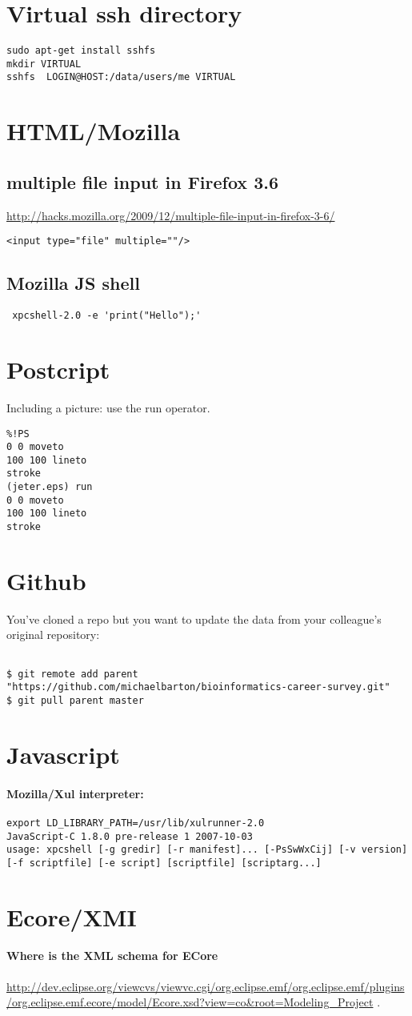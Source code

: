 \documentclass[12pt]{article}
\begin{document}
\section{Virtual ssh directory}
\begin{verbatim}
sudo apt-get install sshfs
mkdir VIRTUAL
sshfs  LOGIN@HOST:/data/users/me VIRTUAL
\end{verbatim}

\section{HTML/Mozilla}
\subsection{multiple file input in Firefox 3.6}
\url{http://hacks.mozilla.org/2009/12/multiple-file-input-in-firefox-3-6/}
\begin{verbatim}
<input type="file" multiple=""/>
\end{verbatim}
\subsection{Mozilla JS shell}
\begin{verbatim}
 xpcshell-2.0 -e 'print("Hello");'
\end{verbatim}
\section{Postcript}
Including a picture: use the run operator.
\begin{verbatim}
%!PS
0 0 moveto
100 100 lineto
stroke
(jeter.eps) run
0 0 moveto
100 100 lineto
stroke
\end{verbatim}
\section{Github}
You've cloned a repo but you want to update the data from your colleague's original repository:
\begin{verbatim}

$ git remote add parent "https://github.com/michaelbarton/bioinformatics-career-survey.git"
$ git pull parent master
\end{verbatim}
\section{Javascript}
\paragraph{Mozilla/Xul interpreter:}
\begin{verbatim}
export LD_LIBRARY_PATH=/usr/lib/xulrunner-2.0
JavaScript-C 1.8.0 pre-release 1 2007-10-03
usage: xpcshell [-g gredir] [-r manifest]... [-PsSwWxCij] [-v version] [-f scriptfile] [-e script] [scriptfile] [scriptarg...]
\end{verbatim}
\section{Ecore/XMI}
\paragraph{Where is the XML schema for ECore}
\url{http://dev.eclipse.org/viewcvs/viewvc.cgi/org.eclipse.emf/org.eclipse.emf/plugins/org.eclipse.emf.ecore/model/Ecore.xsd?view=co&root=Modeling_Project} .
\end{document}
